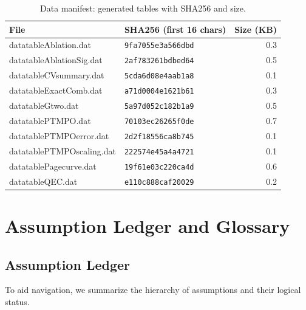 \documentclass[aps,prd,preprint,onecolumn,superscriptaddress,nofootinbib,longbibliography,floatfix,11pt,showpacs,showkeys]{revtex4-2}
\theoremstyle{plain}
\theoremstyle{definition}
\theoremstyle{remark}
\begin{document}
\begin{table}[t]
\centering
\caption{Data manifest: generated tables with SHA256 and size.}
\label{tab:datamanifest}
\small
\begin{tabular}{llr}
\toprule
File & SHA256 (first 16 chars) & Size (KB) \\
\midrule
datatableAblation.dat & \texttt{\footnotesize 9fa7055e3a566dbd} & 0.3 \\
datatableAblationSig.dat & \texttt{\footnotesize 2af783261bdbed64} & 0.5 \\
datatableCVsummary.dat & \texttt{\footnotesize 5cda6d08e4aab1a8} & 0.1 \\
datatableExactComb.dat & \texttt{\footnotesize a71d0004e1621b61} & 0.3 \\
datatableGtwo.dat & \texttt{\footnotesize 5a97d052c182b1a9} & 0.5 \\
datatablePTMPO.dat & \texttt{\footnotesize 70103ec26265f0de} & 0.7 \\
datatablePTMPOerror.dat & \texttt{\footnotesize 2d2f18556ca8b745} & 0.1 \\
datatablePTMPOscaling.dat & \texttt{\footnotesize 222574e45a4a4721} & 0.1 \\
datatablePagecurve.dat & \texttt{\footnotesize 19f61e03c220ca4d} & 0.6 \\
datatableQEC.dat & \texttt{\footnotesize e110c888caf20029} & 0.2 \\
\bottomrule
\end{tabular}
\end{table}

\section{Assumption Ledger and Glossary}
\label{app:glossary}

\subsection{Assumption Ledger}
To aid navigation, we summarize the hierarchy of assumptions and their logical status.
\end{document}
